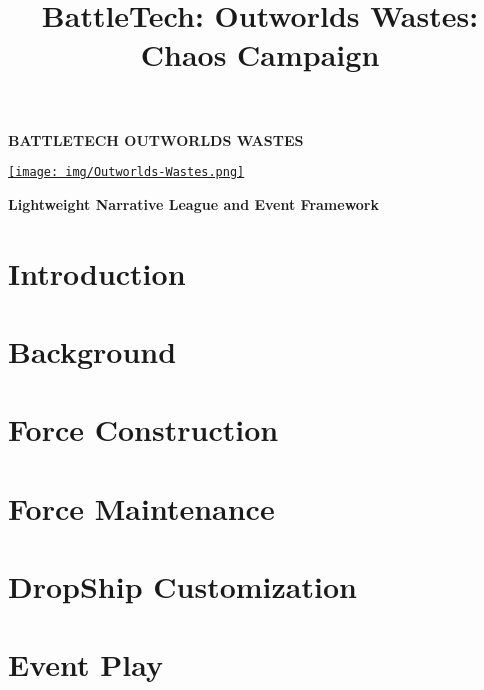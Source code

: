 \documentclass{article}
\title{BattleTech: Outworlds Wastes: Chaos Campaign}
\author{}
\date{}
\newcommand{\mysectiontitle}{}
\newcommand{\newsection}[2]{\renewcommand{\mysectiontitle}{#2}\section{#1}}
\begin{document}
\makeatletter
{}

\begin{center}
  \fontsize{50}{60}\bfseries\selectfont\MakeUppercase{BattleTech}
  \fontsize{30}{37}\bfseries\selectfont\MakeUppercase{Outworlds Wastes}

  \href{https://ko-fi.com/bleptarts}{\texttt{[image: img/Outworlds-Wastes.png]}}

  \LARGE\bfseries{Lightweight Narrative League and Event Framework}
\end{center}

\newsection{Introduction}{introduction}



\newpage

\newsection{Background}{background}



\newsection{Force Construction}{force-construction}



\newpage

\newsection{Force Maintenance}{force-management}
\label{sec:force_management}



\newpage

\newsection{DropShip Customization}{dropship-customization}
\label{sec:dropship_customization}



\newpage

\newsection{Event Play}{event-play}
\label{sec:event_play}
\end{document}
